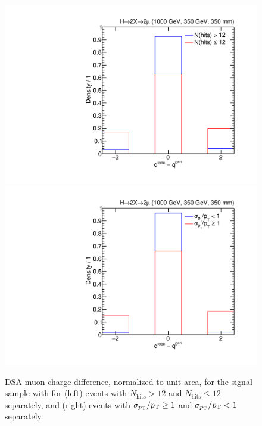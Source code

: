 \begin{figure}[htpb]
  \centering
  \includegraphics[width=\DSquareWidth]{figures/displaced/QCUTRES_Sig_qdiff_hits_1000_350_350.pdf}
  \hspace*{-2em}
  \includegraphics[width=\DSquareWidth]{figures/displaced/QCUTRES_Sig_qdiff_fpte_1000_350_350.pdf}
  \caption{DSA muon charge difference, normalized to unit area, for the \twoMu signal sample with  for (left) events with $N_\text{hits} > 12$ and $N_\text{hits} \leq 12$ separately, and (right) events with $\sigma_{p_{\mathrm{T}}}/p_{\mathrm{T}} \geq 1$ and $\sigma_{p_{\mathrm{T}}}/p_{\mathrm{T}} < 1$ separately.}
  \label{fig:dd:QCUT_QDIFF}
\end{figure}


